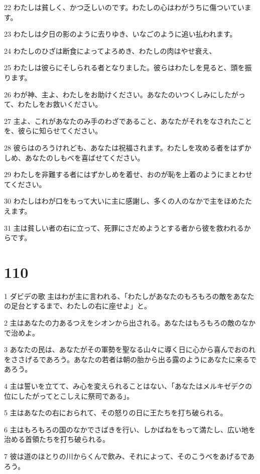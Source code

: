 \par 22 わたしは貧しく、かつ乏しいのです。わたしの心はわがうちに傷ついています。
\par 23 わたしは夕日の影のように去りゆき、いなごのように追い払われます。
\par 24 わたしのひざは断食によってよろめき、わたしの肉はやせ衰え、
\par 25 わたしは彼らにそしられる者となりました。彼らはわたしを見ると、頭を振ります。
\par 26 わが神、主よ、わたしをお助けください。あなたのいつくしみにしたがって、わたしをお救いください。
\par 27 主よ、これがあなたのみ手のわざであること、あなたがそれをなされたことを、彼らに知らせてください。
\par 28 彼らはのろうけれども、あなたは祝福されます。わたしを攻める者をはずかしめ、あなたのしもべを喜ばせてください。
\par 29 わたしを非難する者にはずかしめを着せ、おのが恥を上着のようにまとわせてください。
\par 30 わたしはわが口をもって大いに主に感謝し、多くの人のなかで主をほめたたえます。
\par 31 主は貧しい者の右に立って、死罪にさだめようとする者から彼を救われるからです。

\chapter{110}

\par 1 ダビデの歌 主はわが主に言われる、「わたしがあなたのもろもろの敵をあなたの足台とするまで、わたしの右に座せよ」と。
\par 2 主はあなたの力あるつえをシオンから出される。あなたはもろもろの敵のなかで治めよ。
\par 3 あなたの民は、あなたがその軍勢を聖なる山々に導く日に心から喜んでおのれをささげるであろう。あなたの若者は朝の胎から出る露のようにあなたに来るであろう。
\par 4 主は誓いを立てて、み心を変えられることはない、「あなたはメルキゼデクの位にしたがってとこしえに祭司である」。
\par 5 主はあなたの右におられて、その怒りの日に王たちを打ち破られる。
\par 6 主はもろもろの国のなかでさばきを行い、しかばねをもって満たし、広い地を治める首領たちを打ち破られる。
\par 7 彼は道のほとりの川からくんで飲み、それによって、そのこうべをあげるであろう。


